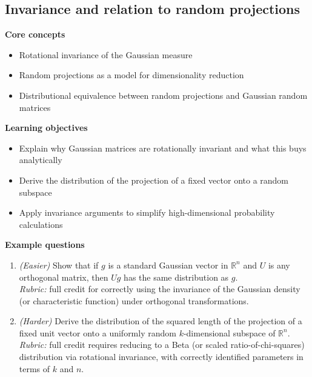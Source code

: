 \documentclass[11pt]{article}
\begin{document}
\subsection{Invariance and relation to random projections}
\textbf{Core concepts}
\begin{itemize}[nosep]
\item Rotational invariance of the Gaussian measure
\item Random projections as a model for dimensionality reduction
\item Distributional equivalence between random projections and Gaussian random matrices
\end{itemize}
\textbf{Learning objectives}
\begin{itemize}[nosep]
\item Explain why Gaussian matrices are rotationally invariant and what this buys analytically
\item Derive the distribution of the projection of a fixed vector onto a random subspace
\item Apply invariance arguments to simplify high-dimensional probability calculations
\end{itemize}
\textbf{Example questions}
\begin{enumerate}[nosep]
\item \emph{(Easier)} Show that if $g$ is a standard Gaussian vector in $\mathbb{R}^n$ and $U$ is any orthogonal matrix, then $Ug$ has the same distribution as $g$. \\
\emph{Rubric:} full credit for correctly using the invariance of the Gaussian density (or characteristic function) under orthogonal transformations.
\item \emph{(Harder)} Derive the distribution of the squared length of the projection of a fixed unit vector onto a uniformly random $k$-dimensional subspace of $\mathbb{R}^n$. \\
\emph{Rubric:} full credit requires reducing to a Beta (or scaled ratio-of-chi-squares) distribution via rotational invariance, with correctly identified parameters in terms of $k$ and $n$.
\end{enumerate}
\end{document}
